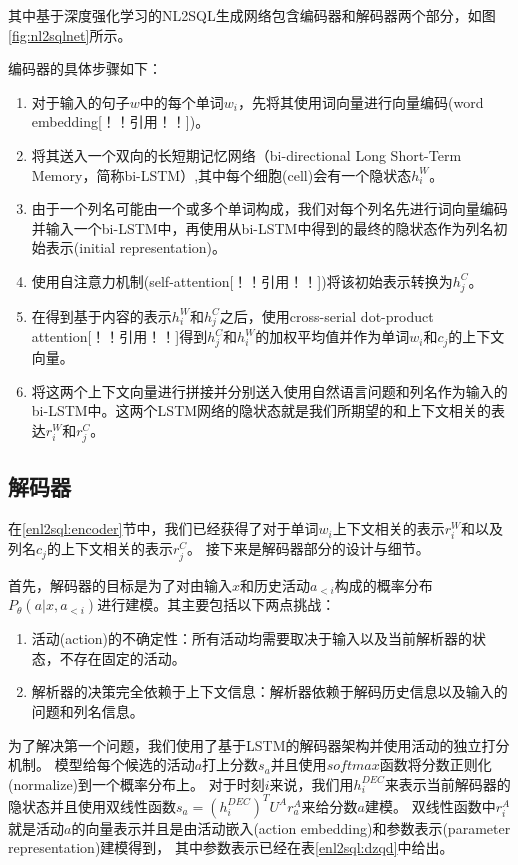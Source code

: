 其中基于深度强化学习的NL2SQL生成网络包含编码器和解码器两个部分，如图\ref{fig:nl2sqlnet}所示。

编码器的具体步骤如下：
\begin{enumerate}
  \item 对于输入的句子$w$中的每个单词$w_i$，先将其使用词向量进行向量编码(word embedding[！！引用！！])。
  \item 将其送入一个双向的长短期记忆网络（bi-directional Long Short-Term Memory，简称bi-LSTM）,其中每个细胞(cell)会有一个隐状态$h^W_i$。
  \item 由于一个列名可能由一个或多个单词构成，我们对每个列名先进行词向量编码并输入一个bi-LSTM中，再使用从bi-LSTM中得到的最终的隐状态作为列名初始表示(initial representation)。
  \item 使用自注意力机制(self-attention[！！引用！！])将该初始表示转换为$h^C_j$。
  \item 在得到基于内容的表示$h^W_i$和$h^C_j$之后，使用cross-serial dot-product attention[！！引用！！]得到$h^C_j$和$h^W_i$的加权平均值并作为单词$w_i$和$c_j$的上下文向量。
  \item 将这两个上下文向量进行拼接并分别送入使用自然语言问题和列名作为输入的bi-LSTM中。这两个LSTM网络的隐状态就是我们所期望的和上下文相关的表达$r^W_i$和$r^C_j$。
\end{enumerate}


\subsection{解码器}
\label{enl2sql:decoder}

在\ref{enl2sql:encoder}节中，我们已经获得了对于单词$w_i$上下文相关的表示$r^W_i$和以及列名$c_j$的上下文相关的表示$r^C_j$。
接下来是解码器部分的设计与细节。

首先，解码器的目标是为了对由输入$x$和历史活动$a_{<i}$构成的概率分布$P_{\theta}(a|x,a_{<i})$进行建模。其主要包括以下两点挑战：
\begin{enumerate}
  \item 活动(action)的不确定性：所有活动均需要取决于输入以及当前解析器的状态，不存在固定的活动。
  \item 解析器的决策完全依赖于上下文信息：解析器依赖于解码历史信息以及输入的问题和列名信息。
\end{enumerate}

为了解决第一个问题，我们使用了基于LSTM的解码器架构并使用活动的独立打分机制。
模型给每个候选的活动$a$打上分数$s_a$并且使用$softmax$函数将分数正则化(normalize)到一个概率分布上。
对于时刻$i$来说，我们用$h^{DEC}_i$来表示当前解码器的隐状态并且使用双线性函数$s_a = (h^{DEC}_i)^T U^A r^A_a$来给分数$a$建模。
双线性函数中$r^A_i$就是活动$a$的向量表示并且是由活动嵌入(action embedding)和参数表示(parameter representation)建模得到，
其中参数表示已经在表\ref{enl2sql:dzqd}中给出。

